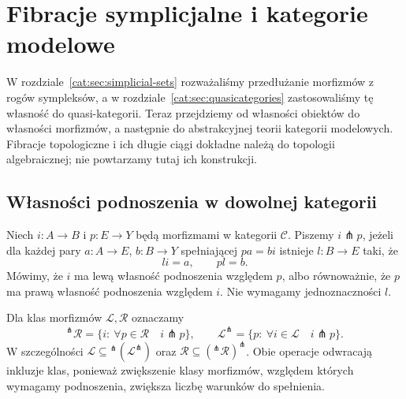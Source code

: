 \section{Fibracje symplicjalne i kategorie modelowe}\label{cat:sec:simplicial-model-categories}

W rozdziale~\ref{cat:sec:simplicial-sets} rozważaliśmy przedłużanie morfizmów z rogów sympleksów, a w rozdziale~\ref{cat:sec:quasicategories} zastosowaliśmy tę własność do quasi-kategorii. Teraz przejdziemy od własności obiektów do własności morfizmów, a następnie do abstrakcyjnej teorii kategorii modelowych. Fibracje topologiczne i ich długie ciągi dokładne należą do topologii algebraicznej; nie powtarzamy tutaj ich konstrukcji.

\subsection{Własności podnoszenia w dowolnej kategorii}

\begin{definicja}\label{cat:def:lifting-property}
Niech $i:A\to B$ i $p:E\to Y$ będą morfizmami w kategorii $\mathcal C$. Piszemy $i\pitchfork p$, jeżeli dla każdej pary $a:A\to E$, $b:B\to Y$ spełniającej $pa=bi$ istnieje $l:B\to E$ taki, że
\[
 li=a,\qquad pl=b.
\]
Mówimy, że $i$ ma lewą własność podnoszenia względem $p$, albo równoważnie, że $p$ ma prawą własność podnoszenia względem $i$. Nie wymagamy jednoznaczności $l$.
\end{definicja}

\begin{center}
\end{center}

Dla klas morfizmów $\mathcal L,\mathcal R$ oznaczamy
\[
 {}^\pitchfork\mathcal R=\{i:\ \forall p\in\mathcal R\quad i\pitchfork p\},
 \qquad
 \mathcal L^\pitchfork=\{p:\ \forall i\in\mathcal L\quad i\pitchfork p\}.
\]
W szczególności $\mathcal L\subseteq{}^\pitchfork(\mathcal L^\pitchfork)$ oraz $\mathcal R\subseteq({}^\pitchfork\mathcal R)^\pitchfork$. Obie operacje odwracają inkluzje klas, ponieważ zwiększenie klasy morfizmów, względem których wymagamy podnoszenia, zwiększa liczbę warunków do spełnienia.

